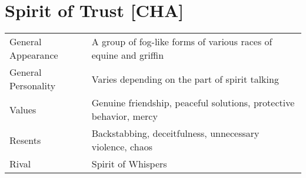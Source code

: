 \documentclass[11pt,a4paper,twocolumn]{book}
\begin{document}
%	
%
%



\section*{Spirit of Trust [CHA]}
{
	\begin{tabu} to 75mm{| X[l,4] | X[l,8] |}
		\hline
		General Appearance  & A group of fog-like forms of various races of equine and griffin   \\
		General Personality & Varies depending on the part of spirit talking                     \\
		Values              & Genuine friendship, peaceful solutions, protective behavior, mercy \\
		Resents             & Backstabbing, deceitfulness, unnecessary violence, chaos           \\
		Rival               & Spirit of Whispers                                                 \\ \hline
	\end{tabu}
	
}
\end{document}
